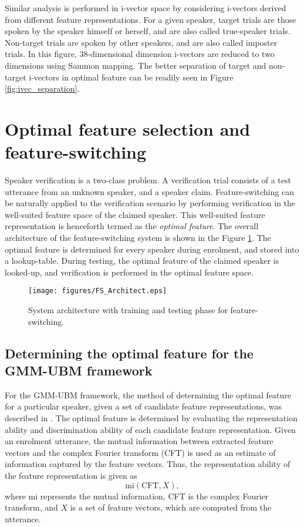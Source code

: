 \documentclass{article}
\begin{document}
Similar analysis is performed in i-vector space by considering i-vectors derived
from different feature representations.  For a given speaker, target trials are
those spoken by the speaker himself or herself, and are also called true-speaker
trials. Non-target trials are spoken by other speakers, and are also called
imposter trials. In this figure, 38-dimensional dimension i-vectors are reduced
to two dimensions using Sammon mapping. The better separation of target and
non-target i-vectors in optimal feature  can be readily seen in Figure
\ref{fig:ivec_separation}.  


\section{Optimal feature selection and feature-switching}
\label{sec:optFeat}

Speaker verification is a two-class problem. A verification trial consists of a
test utterance from an unknown speaker, and a speaker claim. Feature-switching
can be naturally applied to the verification scenario by performing
verification in the well-suited feature space of the claimed speaker. This
well-suited feature representation is henceforth termed as the \emph{optimal
feature}. The overall architecture of the feature-switching system is shown in the
Figure \ref{fig:systemArch}. The optimal feature is determined for every speaker
during enrolment, and stored into a lookup-table. During testing, the optimal
feature of the claimed speaker is looked-up, and verification is performed in
the optimal feature space.

\begin{figure}[th]
\centering
\texttt{[image: figures/FS\_Architect.eps]}
\caption{System architecture with training and testing phase for feature-switching.}
\label{fig:systemArch}
\end{figure}



\subsection{Determining the optimal feature for the GMM-UBM framework}
\label{subsec:ubm_optFeat}

For the GMM-UBM framework, the method of determining the optimal feature for a
particular speaker, given a set of candidate feature representations, was
described in \cite{padmanInterspeech2010}. The optimal feature is determined by
evaluating the representation ability and discrimination ability
of each candidate feature representation. Given an enrolment utterance, the
mutual information between extracted feature vectors and the complex Fourier
transform (CFT) is used as an estimate of information captured by the feature
vectors. Thus, the representation ability of the feature representation is given
as 
\begin{equation}
\textrm{mi}(\textrm{CFT},X),
\end{equation}
where $\textrm{mi}$ represents the mutual information, CFT is the complex
Fourier transform, and $X$ is a set of feature vectors, which are computed from
the utterance.
\end{document}
